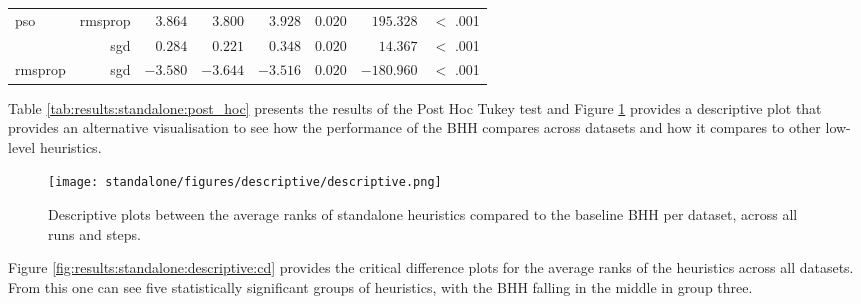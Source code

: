 \begin{table}[htbp]
{\begin{tabular}{lrrrrrrr}
			pso                  & rmsprop              & $3.864$              & $3.800$                                         & $3.928$              & $0.020$              & $195.328$            & $<$ .001    \\
			$ $                  & sgd                  & $0.284$              & $0.221$                                         & $0.348$              & $0.020$              & $14.367$             & $<$ .001    \\
			rmsprop              & sgd                  & $-3.580$             & $-3.644$                                        & $-3.516$             & $0.020$              & $-180.960$           & $<$ .001    \\
			\bottomrule
		\end{tabular}
	}
\end{table}

Table \ref{tab:results:standalone:post_hoc} presents the results of the Post Hoc Tukey test and Figure \ref{fig:results:standalone:descriptive:descriptive} provides a descriptive plot that provides an alternative visualisation to see how the performance of the \Ac{BHH} compares across datasets and how it compares to other low-level heuristics.

\begin{figure}[htbp]
	\centering
	\texttt{[image: standalone/figures/descriptive/descriptive.png]}
	\caption{Descriptive plots between the average ranks of standalone heuristics compared to the baseline \Acs{BHH} per dataset, across all runs and steps.}
	\label{fig:results:standalone:descriptive:descriptive}
\end{figure}

Figure \ref{fig:results:standalone:descriptive:cd} provides the critical difference plots for the average ranks of the heuristics across all datasets. From this one can see five statistically significant groups of heuristics, with the \Ac{BHH} falling in the middle in group three.


